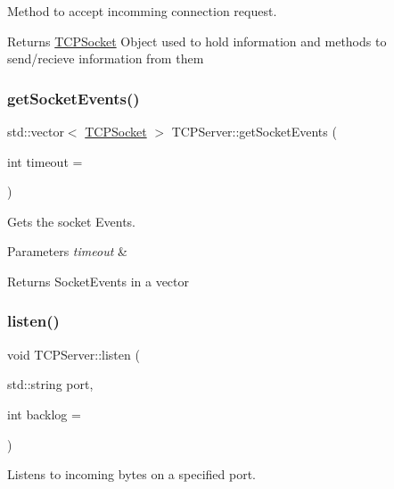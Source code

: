 Method to accept incomming connection request. 

\begin{DoxyReturn}{Returns}
\hyperlink{classTCPSocket}{T\+C\+P\+Socket} Object used to hold information and methods to send/recieve information from them 
\end{DoxyReturn}
\mbox{\label{classTCPServer_ae571b398f08601bac4544bc5d1b341a6}} 
\subsubsection{\texorpdfstring{get\+Socket\+Events()}{getSocketEvents()}}
{\footnotesize\ttfamily std\+::vector$<$ \hyperlink{classTCPSocket}{T\+C\+P\+Socket} $>$ T\+C\+P\+Server\+::get\+Socket\+Events (\begin{DoxyParamCaption}\item[{int}]{timeout = {} }\end{DoxyParamCaption})}



Gets the socket Events. 


\begin{DoxyParams}{Parameters}
{\em timeout} & \\
\hline
\end{DoxyParams}
\begin{DoxyReturn}{Returns}
Socket\+Events in a vector 
\end{DoxyReturn}
\mbox{\label{classTCPServer_adb2ea4f27e98da84fb9e46838578e516}} 
\subsubsection{\texorpdfstring{listen()}{listen()}}
{\footnotesize\ttfamily void T\+C\+P\+Server\+::listen (\begin{DoxyParamCaption}\item[{std\+::string}]{port,  }\item[{int}]{backlog = {} }\end{DoxyParamCaption})}



Listens to incoming bytes on a specified port. 


